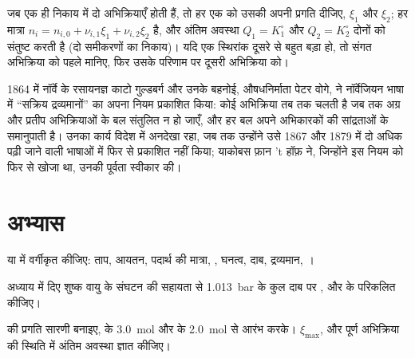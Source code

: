 \begin{method}[दो युगपत् अभिक्रियाएँ]\label{met:b1:extent-q-and-k:two-reactions}
जब एक ही निकाय में दो अभिक्रियाएँ होती हैं, तो हर एक को उसकी अपनी
प्रगति दीजिए, $\xi_1$ और $\xi_2$; हर मात्रा $n_i = n_{i,0} + \nu_{i,1}\xi_1
+ \nu_{i,2}\xi_2$ है, और अंतिम अवस्था $Q_1 = K_1^\circ$ और
$Q_2 = K_2^\circ$ दोनों को संतुष्ट करती है (दो समीकरणों का निकाय)। यदि एक स्थिरांक
दूसरे से बहुत बड़ा हो, तो संगत अभिक्रिया को पहले
 मानिए, फिर उसके परिणाम पर दूसरी अभिक्रिया को।
\end{method}

\begin{history}[द्रव्य-अनुपाती क्रिया का नियम, 1864]
1864 में नॉर्वे के रसायनज्ञ काटो गुल्डबर्ग और उनके बहनोई,
औषधनिर्माता पेटर वोगे, ने नॉर्वेजियन भाषा में ``सक्रिय
द्रव्यमानों'' का अपना नियम प्रकाशित किया: कोई अभिक्रिया तब तक चलती है जब तक अग्र और प्रतीप
अभिक्रियाओं के बल संतुलित न हो जाएँ, और हर बल अपने अभिकारकों की
सांद्रताओं के समानुपाती है। उनका कार्य विदेश में अनदेखा रहा, जब तक उन्होंने उसे 1867 और 1879 में दो अधिक
पढ़ी जाने वाली भाषाओं में फिर से प्रकाशित नहीं किया; याकोबस फ़ान 't हॉफ़ ने, जिन्होंने
इस नियम को फिर से खोजा था, उनकी पूर्वता स्वीकार की।
\end{history}

\section{अभ्यास}

\begin{exercise}[$\star$]\label{exo:b1:extent-q-and-k:1}
 या  में वर्गीकृत कीजिए: ताप, आयतन, पदार्थ की
मात्रा, , घनत्व, दाब, द्रव्यमान, ।
\end{exercise}

\begin{exercise}[$\star$]\label{exo:b1:extent-q-and-k:2}
अध्याय में दिए शुष्क वायु के संघटन की सहायता से \qty{1.013}{bar} के कुल दाब पर
,  और  के  परिकलित कीजिए।
\end{exercise}

\begin{exercise}[$\star$]\label{exo:b1:extent-q-and-k:3}
 की प्रगति सारणी बनाइए,  के \qty{3.0}{mol} और
 के \qty{2.0}{mol} से आरंभ करके। $\xi_{\max}$,  और पूर्ण अभिक्रिया की स्थिति में अंतिम अवस्था ज्ञात कीजिए।
\end{exercise}

